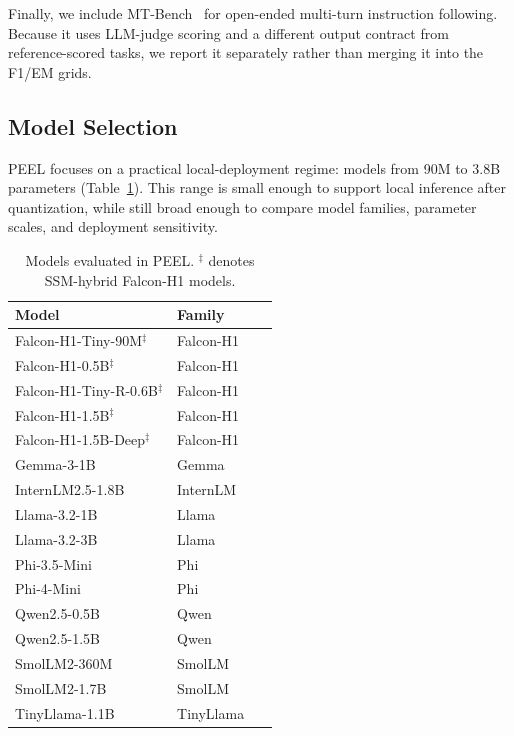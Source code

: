 \documentclass[letterpaper]{article} %
\begin{document}
Finally, we include MT-Bench~\citep{MTBenchArena_2023} for open-ended multi-turn instruction following. Because it uses LLM-judge scoring and a different output contract from reference-scored tasks, we report it separately rather than merging it into the F1/EM grids.
\subsection{Model Selection}
\label{sec:models}

PEEL focuses on a practical local-deployment regime: models from 90M to 3.8B
parameters (Table~\ref{tab:models}). This range is small enough to support
local inference after quantization, while still broad enough to compare model
families, parameter scales, and deployment sensitivity.

\begin{table}[t]
  \small
  \centering

  \begin{tabular}{@{}llc@{}}
    \toprule
    Model & Family \\
    \midrule
    Falcon-H1-Tiny-90M$^\ddagger$       & Falcon-H1~\citep{falconh1} \\
    Falcon-H1-0.5B$^\ddagger$           & Falcon-H1~\citep{falconh1} \\
    Falcon-H1-Tiny-R-0.6B$^\ddagger$    & Falcon-H1~\citep{falconh1}  \\
    Falcon-H1-1.5B$^\ddagger$           & Falcon-H1~\citep{falconh1} &\\
    Falcon-H1-1.5B-Deep$^\ddagger$      & Falcon-H1~\citep{falconh1} \\
    Gemma-3-1B                           & Gemma~\citep{gemmateam2025gemma3technicalreport} \\
    InternLM2.5-1.8B                     & InternLM~\citep{cai2024internlm2} \\
    Llama-3.2-1B                         & Llama~\citep{llama_3_2} \\
    Llama-3.2-3B                         & Llama~\citep{llama_3_2}  \\
    Phi-3.5-Mini                         & Phi~\citep{abdin2024phi3_2023}\\
    Phi-4-Mini                           & Phi~\citep{phi4}  \\
    Qwen2.5-0.5B                         & Qwen~\citep{qwen2025} \\
    Qwen2.5-1.5B                         & Qwen~\citep{qwen2025}  \\
    SmolLM2-360M                         & SmolLM~\citep{allal2025smollm2smolgoesbig} \\
    SmolLM2-1.7B                         & SmolLM~\citep{allal2025smollm2smolgoesbig} \\
    TinyLlama-1.1B                       & TinyLlama~\citep{tinyllama_2024}  \\
    \bottomrule
  \end{tabular}
    \caption{Models evaluated in PEEL.
  $^\ddagger$ denotes SSM-hybrid Falcon-H1 models.}
    \label{tab:models}
\end{table}
\end{document}
